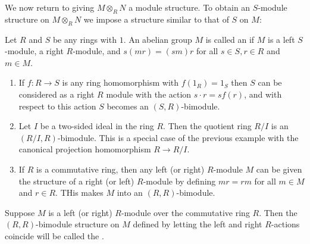 \documentclass[12pt, a4paper, oneside, openright, titlepage]{book}
\begin{document}
We now return to giving $M\otimes_RN$ a module structure. To obtain an $S$-module structure on $M\otimes_RN$ we impose a structure similar to that of $S$ on $M$: 

\begin{defn}
    Let $R$ and $S$ be any rings with $1$. An abelian group $M$ is called an  if $M$ is a left $S$-module, a right $R$-module, and $s(mr) = (sm)r$ for all $s \in S, r \in R$ and $m \in M$.
\end{defn}

\begin{eg}
    \leavevmode
    \begin{enumerate}
        \item If $f:R\rightarrow S$ is any ring homomorphism with $f(1_R) = 1_S$ then $S$ can be considered as a right $R$ module with the action $s \cdot r = sf(r)$, and with respect to this action $S$ becomes an $(S,R)$-bimodule.
        \item Let $I$ be a two-sided ideal in the ring $R$. Then the quotient ring $R/I$ is an $(R/I,R)$-bimodule. This is a special case of the previous example with the canonical projection homomorphism $R\rightarrow R/I$.
        \item If $R$ is a commutative ring, then any left (or right) $R$-module $M$ can be given the structure of a right (or left) $R$-module by defining $mr = rm$ for all $m \in M$ and $r \in R$. THis makes $M$ into an $(R,R)$-bimodule.
    \end{enumerate}
\end{eg}

\begin{defn}
    Suppose $M$ is a left (or right) $R$-module over the commutative ring $R$. Then the $(R,R)$-bimodule structure on $M$ defined by letting the left and right $R$-actions coincide will be called the .
\end{defn}
\end{document}
